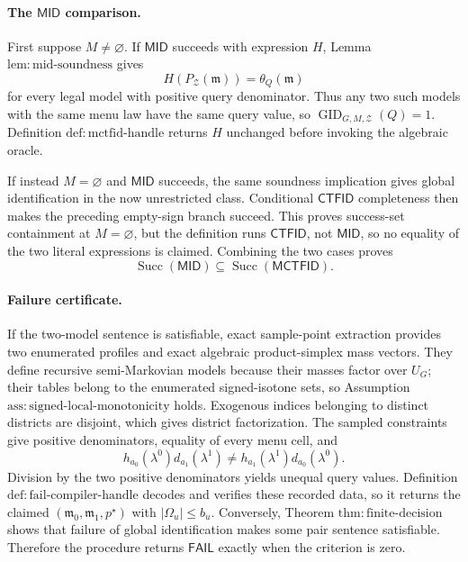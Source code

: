 \paragraph{The \(\mathsf{MID}\) comparison.}
First suppose \(M\ne\varnothing\).  If \(\mathsf{MID}\) succeeds with expression \(H\), Lemma \(\mathrm{lem:mid\text{-}soundness}\) gives
\[
 H(P_{\mathcal Z}(\mathfrak m))=\theta_Q(\mathfrak m)
\]
for every legal model with positive query denominator.  Thus any two such models with the same menu law have the same query value, so \(\operatorname{GID}_{G,M,\mathcal Z}(Q)=1\).  Definition \(\mathrm{def:mctfid\text{-}handle}\) returns \(H\) unchanged before invoking the algebraic oracle.

If instead \(M=\varnothing\) and \(\mathsf{MID}\) succeeds, the same soundness implication gives global identification in the now unrestricted class.  Conditional \(\mathsf{CTFID}\) completeness then makes the preceding empty-sign branch succeed.  This proves success-set containment at \(M=\varnothing\), but the definition runs \(\mathsf{CTFID}\), not \(\mathsf{MID}\), so no equality of the two literal expressions is claimed.  Combining the two cases proves
\[
 \operatorname{Succ}(\mathsf{MID})\subseteq\operatorname{Succ}(\mathsf{MCTFID}).
\]

\paragraph{Failure certificate.}
If the two-model sentence is satisfiable, exact sample-point extraction provides two enumerated profiles and exact algebraic product-simplex mass vectors.  They define recursive semi-Markovian models because their masses factor over \(U_G\); their tables belong to the enumerated signed-isotone sets, so Assumption \(\mathrm{ass:signed\text{-}local\text{-}monotonicity}\) holds.  Exogenous indices belonging to distinct districts are disjoint, which gives district factorization.  The sampled constraints give positive denominators, equality of every menu cell, and
\[
 h_{a_0}(\lambda^0)d_{a_1}(\lambda^1)
 \ne h_{a_1}(\lambda^1)d_{a_0}(\lambda^0).
\]
Division by the two positive denominators yields unequal query values.  Definition \(\mathrm{def:fail\text{-}compiler\text{-}handle}\) decodes and verifies these recorded data, so it returns the claimed \((\mathfrak m_0,\mathfrak m_1,p^\star)\) with \(|\Omega_u|\le b_u\).  Conversely, Theorem \(\mathrm{thm:finite\text{-}decision}\) shows that failure of global identification makes some pair sentence satisfiable.  Therefore the procedure returns \(\mathsf{FAIL}\) exactly when the criterion is zero.

